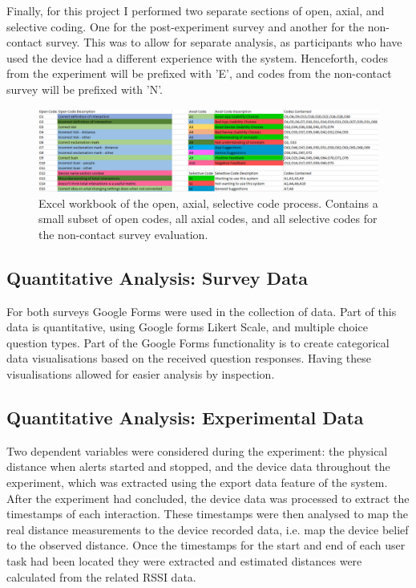 \documentclass{l4proj}
\begin{document}
Finally, for this project I performed two separate sections of open, axial, and selective coding. One for the post-experiment survey and another for the non-contact survey. This was to allow for separate analysis, as participants who have used the device had a different experience with the system. Henceforth, codes from the experiment will be prefixed with 'E', and codes from the non-contact survey will be prefixed with 'N'.

\begin{figure}[!htb]
    \centering
    \includegraphics[width=1.0\linewidth]{images/codes.png}

    \caption{ Excel workbook of the open, axial, selective code process. Contains a small subset of open codes, all axial codes, and all selective codes for the non-contact survey evaluation. }

    \label{fig:oas_codes}
\end{figure}

\subsection{Quantitative Analysis: Survey Data}

For both surveys Google Forms were used in the collection of data. Part of this data is quantitative, using Google forms Likert Scale, and multiple choice question types. Part of the Google Forms functionality is to create categorical data visualisations based on the received question responses. Having these visualisations allowed for easier analysis by inspection.

\subsection{Quantitative Analysis: Experimental Data}

Two dependent variables were considered during the experiment: the physical distance when alerts started and stopped, and the device data throughout the experiment, which was extracted using the export data feature of the system. After the experiment had concluded, the device data was processed to extract the timestamps of each interaction. These timestamps were then analysed to map the real distance measurements to the device recorded data, i.e. map the device belief to the observed distance. Once the timestamps for the start and end of each user task had been located they were extracted and estimated distances were calculated from the related RSSI data.
\end{document}
